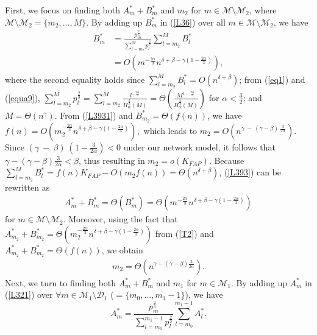 \documentclass[10pt,journal,compsoc,onecolumn]{IEEEtran}
\begin{document}
First, we focus on finding both $A_m^*+B_m^*$ and $m_2$ for $m
\in\mathcal{M}\setminus\mathcal{M}_2$, where
$\mathcal{M}\setminus\mathcal{M}_2=\lbrace m_2,...,M\rbrace$. By
adding up $B_m^*$ in (\ref{L36}) over all $m \in
\mathcal{M}\setminus \mathcal{M}_2$, we have
\begin{subequations}
\begin{align}
B_m^* &=\frac{
p^{\frac{2}{3}}_m}{\sum_{l=m_2}^{M}p^{\frac{2}{3}}_l}\sum_{l=m_2}^{M}
B_l^*\label{L393}\\&=O\left(m^{-\frac{2\alpha}{3}}n^{\delta+\beta-\gamma\left(1-\frac{2\alpha}{3}\right)}\right),\label{L3931}
\end{align}
\end{subequations}
where the second equality holds since
$\sum_{l=m_2}^{M}B_l^*=O\left(n^{\delta+\beta}\right)$; from
(\ref{eq1}) and (\ref{equa9}), $\sum_{l=m_2}^{M}
p^{\frac{2}{3}}_l=\sum_{l=m_2}^{M}
\frac{l^{-\frac{2\alpha}{3}}}{H^{\frac{2}{3}}_{\alpha}(M)}=\Theta\left(\frac{M^{1-\frac{2\alpha}{3}}}{H^{\frac{2}{3}}_{\alpha}(M)}\right)$
for $\alpha<\frac{3}{2}$; and $M=\Theta\left(n^\gamma\right)$.
From (\ref{L3931}) and $B_{m_2}^*=\Theta(f(n))$, we have
$f(n)=O\left(m_2^{-\frac{2\alpha}{3}}n^{\delta+\beta-\gamma\left(1-\frac{2\alpha}{3}\right)}\right),$
which leads to $
m_2=O\left(n^{\gamma~-~(\gamma-\beta)~\frac{3}{2\alpha}}\right)$.
Since $(\gamma~-~\beta)~(1-\frac{3}{2\alpha})<0$ under our network
model, it follows that
$\gamma-(\gamma-\beta)\frac{3}{2\alpha}<\beta$, thus resulting in
$m_2=o(K_{FAP})$. Because
$\sum_{l=m_2}^{M}B_l^*=f(n)K_{FAP}-O(m_2f(n))=\Theta(n^{\delta+\beta})$,
(\ref{L393}) can be rewritten as
\begin{align}
\label{T2} A_m^*+B_m^*=\Theta\left(
B_m^*\right)=\Theta\left(m^{-\frac{2\alpha}{3}}n^{\delta+\beta-\gamma\left(1-\frac{2\alpha}{3}\right)}\right)
\end{align}
for $m\in \mathcal{M}\setminus\mathcal{M}_2$. Moreover, using the
fact that $A_{m_2}^*+B_{m_2}^*
=\Theta\left(m_2^{-\frac{2\alpha}{3}}n^{\delta+\beta-\gamma\left(1-\frac{2\alpha}{3}\right)}\right)$
from (\ref{T2}) and $A_{m_2}^*+B_{m_2}^*=\Theta(f(n))$, we obtain
\begin{align}
\label{L3955}
m_2=\Theta\left(n^{\gamma-(\gamma-\beta)\frac{3}{2\alpha}}\right).
\end{align}
Next, we turn to finding both $A_m^*+B_m^*$ and $m_1$ for $m
\in\mathcal{M}_1$. By adding up $A_m^*$ in (\ref{L321}) over
$\forall m \in \mathcal{M}_1\setminus\mathcal{D}_1$ ($=\lbrace
m_0,...,m_1-1 \rbrace$), we have
\begin{equation}
\label{L3972} A_{m}^* =\frac{
p^{\frac{2}{3}}_{m}}{\sum_{l=m_0}^{m_1-1}p^{\frac{2}{3}}_l}\sum_{l=m_0}^{m_1-1}A_l^*.
\end{equation}
\end{document}
